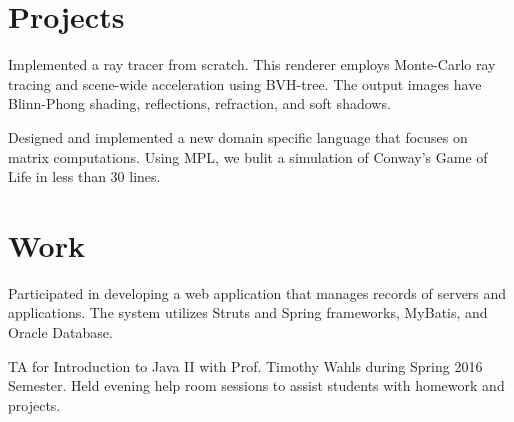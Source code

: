 \documentclass[]{deedy-resume-openfont}
\begin{document}
\begin{minipage}[t]{0.66\textwidth}

\section{Projects}

Implemented a ray tracer from scratch. This renderer employs Monte-Carlo ray tracing and scene-wide acceleration using BVH-tree. The output images have Blinn-Phong shading, reflections, refraction, and soft shadows.
\sectionsep


Designed and implemented a new domain specific language that focuses on matrix computations. Using MPL, we bulit a simulation of Conway's Game of Life in less than 30 lines.
\sectionsep





\section{Work}

Participated in developing a web application that manages records of servers and applications.
The system utilizes Struts and Spring frameworks, MyBatis, and Oracle Database.
\sectionsep

TA for Introduction to Java II with Prof. Timothy Wahls during Spring 2016 Semester. Held evening help room sessions to assist students with homework and projects.
\sectionsep


\end{minipage}
\end{document}
